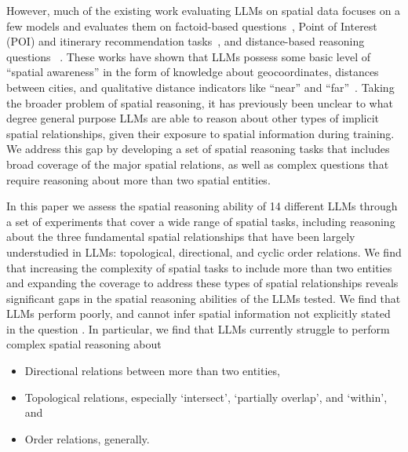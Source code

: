 However, much of the existing work evaluating LLMs on spatial data focuses on a few models and evaluates them on factoid-based questions~\cite{Qi2023,Roberts2023,Gupta2024,Yan2024}, Point of Interest (POI) and itinerary recommendation tasks~\cite{Schneider2025,Yu2025,Roberts2023,Xie2024,Gundawar2024,De2024}, and distance-based reasoning questions~\cite{Bhandari2023,Osullivan2024} .
These works have shown that LLMs possess some basic level of ``spatial awareness'' in the form of knowledge about geocoordinates, distances between cities, and qualitative distance indicators like ``near'' and ``far''~\cite{Bhandari2023,Qi2023,Osullivan2024}.
Taking the broader problem of spatial reasoning, it has previously been unclear to what degree general purpose LLMs are able to reason about other types of implicit spatial relationships, given their exposure to spatial information during training.
We address this gap by developing a set of spatial reasoning tasks that includes broad coverage of the major spatial relations, as well as complex questions that require reasoning about more than two spatial entities.

In this paper we assess the spatial reasoning ability of 14 different LLMs through a set of experiments that cover a wide range of spatial tasks, including reasoning about the three fundamental spatial relationships that have been largely understudied in LLMs: topological, directional, and cyclic order relations.
We find that increasing the complexity of spatial tasks to include more than two entities and expanding the coverage to address these types of spatial relationships reveals significant gaps in the spatial reasoning abilities of the LLMs tested. 
We find that LLMs perform poorly, and cannot infer spatial information not explicitly stated in the question .
In particular, we find that LLMs currently struggle to perform complex spatial reasoning about

\begin{itemize}
    \item Directional relations between more than two entities, 
    \item Topological relations, especially `intersect', `partially overlap', and `within', and
    \item Order relations, generally.
\end{itemize}

